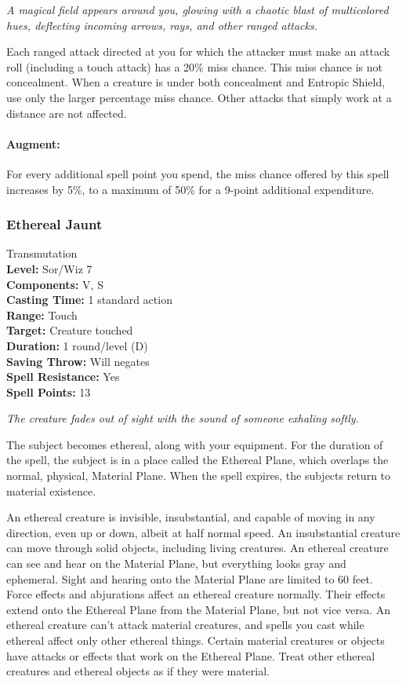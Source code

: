 \emph{A magical field appears around you, glowing with a chaotic blast of multicolored hues, deflecting incoming arrows, rays, and other ranged attacks.} 
 
Each ranged attack directed at you for which the attacker must make an attack roll (including a touch attack) has a 20\% miss chance.
This miss chance is not concealment. When a creature is under both concealment and Entropic Shield, use only the larger percentage miss chance.
Other attacks that simply work at a distance are not affected.

\paragraph{Augment:} For every additional spell point you spend, the miss chance offered by this spell increases by 5\%, to a maximum of 50\% for a 9-point additional expenditure.
\subsubsection{Ethereal Jaunt}
\label{Spell:EtherealJaunt}
Transmutation
\\ \textbf{Level:} Sor/Wiz 7
\\ \textbf{Components:} V, S
\\ \textbf{Casting Time:} 1 standard action
\\ \textbf{Range:} Touch
\\ \textbf{Target:} Creature touched
\\ \textbf{Duration:} 1 round/level (D)
\\ \textbf{Saving Throw:} Will negates
\\ \textbf{Spell Resistance:} Yes
\\ \textbf{Spell Points:} 13

\emph{The creature fades out of sight with the sound of someone exhaling softly.}

The subject becomes ethereal, along with your equipment. 
For the duration of the spell, the subject is in a place called the Ethereal Plane, which overlaps the normal, physical, Material Plane. 
When the spell expires, the subjects return to material existence.

An ethereal creature is invisible, insubstantial, and capable of moving in any direction, even up or down, albeit at half normal speed. 
An insubstantial creature can move through solid objects, including living creatures. 
An ethereal creature can see and hear on the Material Plane, but everything looks gray and ephemeral. 
Sight and hearing onto the Material Plane are limited to 60 feet.
Force effects and abjurations affect an ethereal creature normally. 
Their effects extend onto the Ethereal Plane from the Material Plane, but not vice versa. 
An ethereal creature can't attack material creatures, and spells you cast while ethereal affect only other ethereal things. 
Certain material creatures or objects have attacks or effects that work on the Ethereal Plane.
Treat other ethereal creatures and ethereal objects as if they were material.

